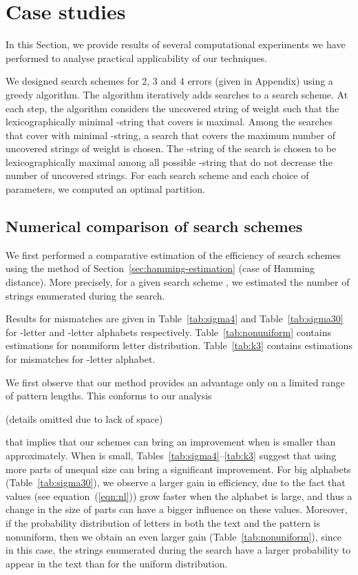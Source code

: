 \documentclass[12pt]{article}
\newif\iffull
\begin{document}
\section{Case studies}\label{sec:experiments}
In this Section, we provide results of several computational
experiments we have performed to analyse practical applicability
of our techniques. 

We designed search schemes for 2, 3 and 4 errors (given in Appendix) using a
greedy algorithm. The algorithm iteratively adds searches to a search
scheme. 
At each step, the algorithm considers the uncovered string  of weight 
such that the lexicographically minimal -string that covers 
is maximal.
Among the searches that cover  with minimal -string, a search that
covers the maximum number of uncovered strings of weight  is chosen.
The -string of the search is chosen to be lexicographically maximal among
all possible -string that do not decrease the number of uncovered strings.
For each search scheme and each choice of parameters, we computed an
optimal partition. 

\subsection{Numerical comparison of search schemes}
\label{subsec:experimenttheor}
We first performed a comparative estimation of the efficiency of
search schemes using the method of Section~\ref{sec:hamming-estimation}
(case of Hamming distance). More precisely, for a given search scheme ,
we estimated the number of strings
 enumerated during the search. 

Results for  mismatches are given in Table~\ref{tab:sigma4} and
Table~\ref{tab:sigma30} for -letter and -letter alphabets
respectively.
Table~\ref{tab:nonuniform} contains estimations for nonuniform letter
distribution.
Table~\ref{tab:k3} contains estimations for 
mismatches for -letter alphabet.


We first observe that our method provides an advantage
only on a limited range of pattern lengths. This conforms to our analysis 
\iffull
(see Section~\ref{sec:uneven})
\else
(details omitted due to lack of space)
\fi
that implies that our schemes can bring an improvement when  is smaller than
 approximately. 
When  is small, Tables~\ref{tab:sigma4}--\ref{tab:k3} suggest that
using more parts of unequal size can
bring a significant improvement. 
For big alphabets (Table~\ref{tab:sigma30}),
we observe a larger gain in efficiency,
due to the fact that values 
 (see equation~(\ref{eqn:nl})) grow faster when the
alphabet is large, and thus a change in the size of parts can
have a bigger influence on these values.
Moreover, if the probability distribution of letters in both the text and
the pattern is nonuniform,
then we obtain an even larger gain (Table~\ref{tab:nonuniform}), since in this case, the
strings enumerated during the search have a larger probability to
appear in the text than for the uniform distribution. 
\end{document}
